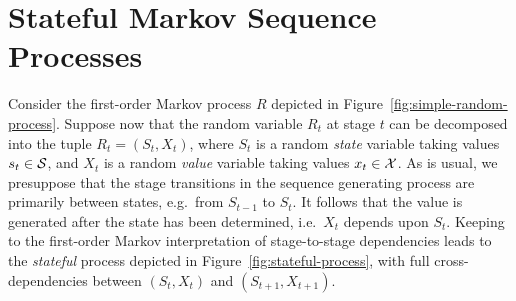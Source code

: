 \documentclass[a4paper]{article}
\begin{document}
\section{Stateful Markov Sequence Processes}
Consider the first-order Markov process $R$ depicted in Figure~\ref{fig:simple-random-process}.
Suppose now that the random variable $R_t$ at stage $t$ can be decomposed into the tuple
$R_t=(S_t,X_t)$, where $S_t$ is a random {\em state} variable taking values $s_t\in{\cal S}$, and $X_t$
is a random {\em value} variable taking values $x_t\in{\cal X}$.
As is usual, we presuppose that the stage transitions in the sequence generating process are primarily between states, e.g.\ from $S_{t-1}$ to $S_t$.
It follows that the value is generated after the state has been determined, i.e.\ $X_t$ depends upon $S_t$.
Keeping to the first-order Markov interpretation of stage-to-stage dependencies leads to
the {\em stateful} process depicted in Figure~\ref{fig:stateful-process}, with full cross-dependencies between $(S_t,X_t)$ and
$(S_{t+1},X_{t+1})$.
\end{document}
